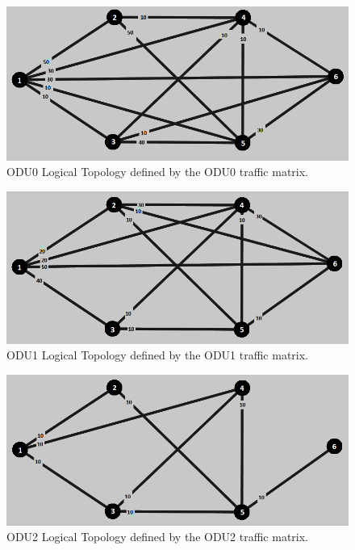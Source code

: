 \begin{figure}[H]
\centering
\includegraphics[width=13cm]{sdf/heuristic/transparent_protection/medium/logical_topology_odu0_medium}
\caption{ODU0 Logical Topology defined by the ODU0 traffic matrix.}
\label{logical_ODU0_protection_ref_medium_heuristic_transparent}
\end{figure}

\begin{figure}[H]
\centering
\includegraphics[width=13cm]{sdf/heuristic/transparent_protection/medium/logical_topology_odu1_medium}
\caption{ODU1 Logical Topology defined by the ODU1 traffic matrix.}
\label{logical_ODU1_protection_ref_medium_heuristic_transparent}
\end{figure}

\begin{figure}[H]
\centering
\includegraphics[width=13cm]{sdf/heuristic/transparent_protection/medium/logical_topology_odu2_medium}
\caption{ODU2 Logical Topology defined by the ODU2 traffic matrix.}
\label{logical_ODU2_protection_ref_medium_heuristic_transparent}
\end{figure}

